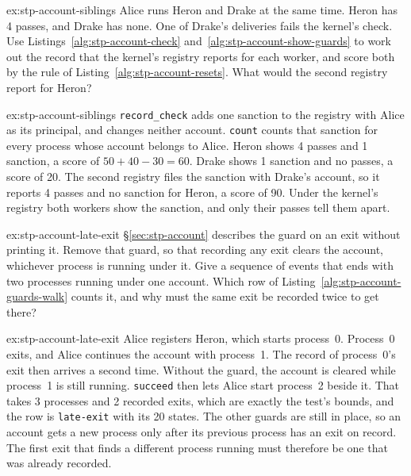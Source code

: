 \documentclass[11pt,a4paper]{article}
\theoremstyle{definition}
\begin{document}
\begin{pdexercise}[kind=Trace,rating=2]{ex:stp-account-siblings}
Alice runs Heron and Drake at the same time. Heron has 4 passes, and
Drake has none. One of Drake's deliveries fails the kernel's check. Use
Listings~\ref{alg:stp-account-check} and~\ref{alg:stp-account-show-guards}
to work out the record that the kernel's registry reports for each
worker, and score both by the rule of
Listing~\ref{alg:stp-account-resets}. What would the second registry
report for Heron?
\end{pdexercise}
\begin{pdsolution}{ex:stp-account-siblings}
\texttt{record\_check} adds one sanction to the registry with Alice as
its principal, and changes neither account. \texttt{count} counts that
sanction for every process whose account belongs to Alice. Heron shows 4
passes and 1 sanction, a score of $50+40-30=60$. Drake shows 1 sanction
and no passes, a score of 20. The second registry files the sanction with
Drake's account, so it reports 4 passes and no sanction for Heron, a
score of 90. Under the kernel's registry both workers show the sanction,
and only their passes tell them apart.
\end{pdsolution}
\begin{pdexercise}[kind=Trace,rating=2]{ex:stp-account-late-exit}
\S\ref{sec:stp-account} describes the guard on an exit without printing
it. Remove that guard, so that recording any exit clears the account,
whichever process is running under it. Give a sequence of events that
ends with two processes running under one account. Which row of
Listing~\ref{alg:stp-account-guards-walk} counts it, and why must the
same exit be recorded twice to get there?
\end{pdexercise}
\begin{pdsolution}{ex:stp-account-late-exit}
Alice registers Heron, which starts process~0. Process~0 exits, and Alice
continues the account with process~1. The record of process~0's exit
then arrives a second time. Without the guard, the account is cleared
while process~1 is still running. \texttt{succeed} then lets Alice start
process~2 beside it. That takes 3 processes and 2 recorded exits, which
are exactly the test's bounds, and the row is \texttt{late-exit} with its
20 states. The other guards are still in place, so an account gets a new
process only after its previous process has an exit on record. The first
exit that finds a different process running must therefore be one that
was already recorded.
\end{pdsolution}
\end{document}
